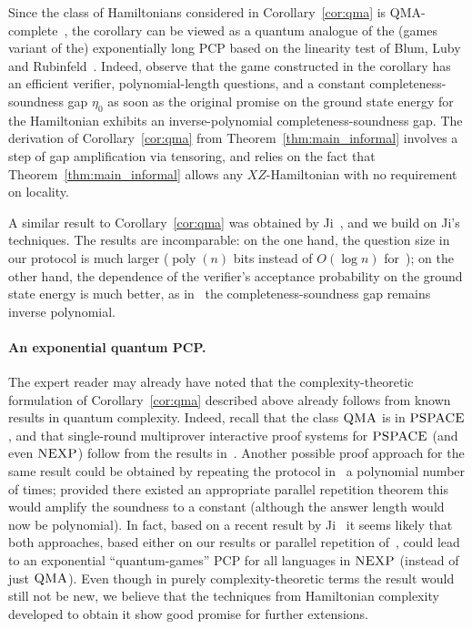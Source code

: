 \documentclass[11pt,letterpaper]{article}
\newcommand{\<}{\langle}
\renewcommand{\>}{\rangle}
\newcommand{\QMA}{\textsc{QMA}}
\newcommand{\NEXP}{\textsc{NEXP}}
\newcommand{\PSPACE}{\textsc{PSPACE}}
\DeclareMathOperator{\poly}{poly}
\begin{document}
Since the class of Hamiltonians considered in Corollary~\ref{cor:qma}
is QMA-complete~\cite{CM13}, the corollary can be viewed as a
quantum analogue of the (games variant of the) exponentially long PCP
based on the linearity test of Blum, Luby and
Rubinfeld~\cite{BLR93}.
	Indeed, observe that the game constructed in the
corollary has an efficient verifier, polynomial-length questions, and
a constant completeness-soundness gap $\eta_0$ as soon as the original promise
on the ground state energy for the Hamiltonian exhibits an
inverse-polynomial completeness-soundness gap. The derivation of
Corollary~\ref{cor:qma} from Theorem~\ref{thm:main_informal} involves a step of
gap amplification via tensoring, and relies on the fact that
Theorem~\ref{thm:main_informal} allows any $XZ$-Hamiltonian with no
requirement on locality.

A similar result to Corollary~\ref{cor:qma} was obtained by
Ji~\cite{ji2015classical}, and we build on Ji's techniques. The results
are incomparable: on the one hand, the question size in our protocol
is much larger ($\poly(n)$ bits instead of $O(\log n)$
for~\cite{ji2015classical}); on the other hand, the dependence of the
verifier's acceptance probability on the ground state energy is much
better, as in~\cite{ji2015classical} the completeness-soundness gap
remains inverse polynomial.

\paragraph{An exponential quantum PCP.} 
The expert reader may already have noted that the complexity-theoretic
formulation of Corollary~\ref{cor:qma} described above already follows
from known results in quantum complexity. Indeed, recall that the
class $\QMA$ is in $\PSPACE$, and that single-round multiprover
interactive proof systems for $\PSPACE$ (and even $\NEXP$) follow from
the results in~\cite{IV12,Vidick13xor}. Another possible proof
approach for the same result could be obtained by repeating the
protocol in~\cite{ji2015classical} a polynomial number of times;
provided there existed an appropriate parallel repetition theorem this
would amplify the soundness to a constant (although the answer length
would now be polynomial). In fact, based on a recent result by Ji~\cite{ji16nexp} it seems likely that both approaches, based either on our results or parallel repetition of~\cite{ji16nexp}, could lead to an exponential ``quantum-games'' PCP for all languages in $\NEXP$ (instead of just $\QMA$). Even though in purely complexity-theoretic terms the result would still not be new, we believe that the techniques from Hamiltonian complexity developed to obtain it show good promise for further extensions. 
\end{document}
